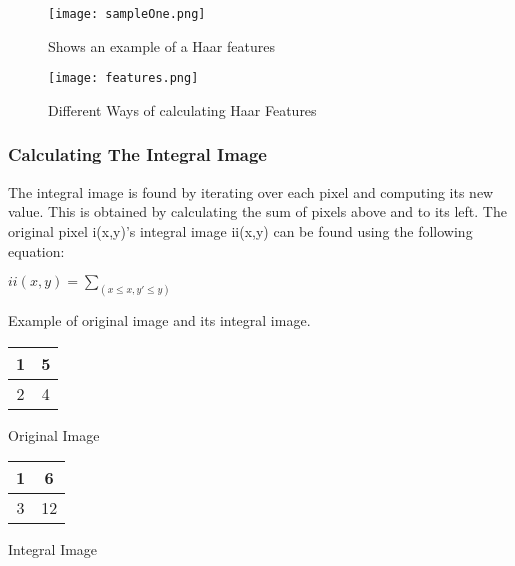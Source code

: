     \begin{figure}[ht]
        \texttt{[image: sampleOne.png]}
        \centering
        \caption{Shows an example of a Haar features}
        \label{features}
    \end{figure}


    \begin{figure}[H]
        \texttt{[image: features.png]}
        \centering
        \caption{Different Ways of calculating Haar Features}
        \label{ways}
        
    \end{figure}

    \subsubsection{Calculating The Integral Image}
    The integral image is found by iterating over each pixel and
    computing its new value. This is obtained by calculating the sum
    of pixels above and to its left. The original pixel i(x,y)’s
    integral image ii(x,y) can be found using the following
    equation:

    \begin{center}
        \large{
            \(ii(x,y)= \sum_{(x \leq x,y' \leq y)}\)
        }
    \end{center}

    Example of original image and its integral image. 

    \begin{center}
        \begin{tabular}{ |c|c| }
            \hline
            1 & 5 \\ 
            \hline
            2 & 4 \\  
            \hline
        \end{tabular}

        Original Image
       \end{center}


       \begin{center}
            \begin{tabular}{ |c|c| }
                \hline
                1 & 6 \\ 
                \hline
                3 & 12 \\  
                \hline
            \end{tabular}

            Integral Image
        \end{center}



